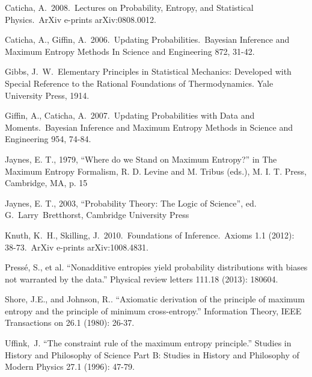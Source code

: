 \documentclass[a4paper, 11pt]{article}
\begin{document}
\begin{thebibliography}{}
 Caticha, A.\ 2008.\ Lectures 
on Probability, Entropy, and Statistical Physics.\ ArXiv e-prints 
arXiv:0808.0012. 

 Caticha, A., 
Giffin, A.\ 2006.\ Updating Probabilities.\ Bayesian Inference and Maximum 
Entropy Methods In Science and Engineering 872, 31-42.

 Gibbs, J.~W.~Elementary Principles in
Statistical Mechanics: Developed with Special Reference to the Rational
Foundations of Thermodynamics. Yale University Press, 1914.

 Giffin, A., 
Caticha, A.\ 2007.\ Updating Probabilities with Data and Moments.\ Bayesian 
Inference and Maximum Entropy Methods in Science and Engineering 954, 
74-84.

 Jaynes, E. T., 1979, ``Where do we Stand on Maximum Entropy?'' in The Maximum Entropy Formalism, R. D. Levine and M. Tribus (eds.), M. I. T. Press, Cambridge, MA, p. 15

 Jaynes, E. T., 2003, ``Probability Theory:
The Logic of Science'', ed. G.~Larry~Bretthorst, Cambridge University Press

 Knuth, K.~H., 
Skilling, J.\ 2010.\ Foundations of Inference.\
Axioms 1.1 (2012): 38-73.\
ArXiv e-prints arXiv:1008.4831. 

Pressé, S., et al. ``Nonadditive entropies yield probability distributions with biases not warranted by the data.'' Physical review letters 111.18 (2013): 180604.

\bibitem[Shore and Johnson(1980)]{shore_johnson}
Shore, J.E., and Johnson, R.. ``Axiomatic derivation of the principle of maximum entropy and the principle of minimum cross-entropy.'' Information Theory, IEEE Transactions on 26.1 (1980): 26-37.

\bibitem[Uffink(1996)]{uffink} Uffink,~J. ``The constraint rule of the maximum entropy principle.'' Studies in History and Philosophy of Science Part B: Studies in History and Philosophy of Modern Physics 27.1 (1996): 47-79.
\end{thebibliography}
\end{document}
